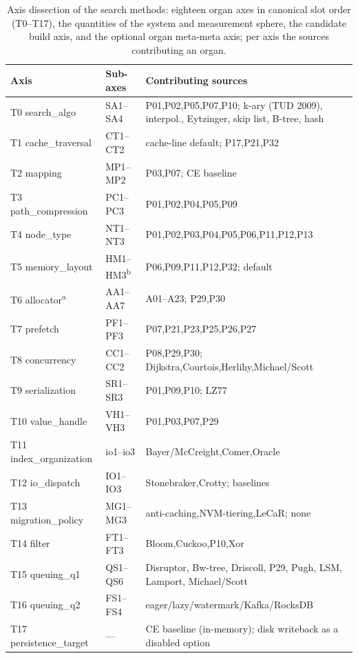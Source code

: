 \begin{nurlang}
\begin{table}[!htbp]
  \caption{Axis dissection of the search methods: eighteen organ axes in canonical
  slot order (T0--T17), the quantities of the system and measurement sphere, the
  candidate build axis, and the optional organ meta-meta axis; per axis the sources contributing an organ.}\label{tab:axes-overview}
  \centering\footnotesize
  \begin{tabular}{@{}l l p{6.8cm}@{}}
    \toprule
    \textbf{Axis} & \textbf{Sub-axes} & \textbf{Contributing sources} \\
    \midrule
    T0 search\_algo & SA1--SA4 & P01,P02,P05,P07,P10; k-ary (TUD 2009), interpol., Eytzinger, skip list, B-tree, hash \\
    T1 cache\_traversal & CT1--CT2 & cache-line default; P17,P21,P32 \\
    T2 mapping & MP1--MP2 & P03,P07; CE baseline \\
    T3 path\_compression & PC1--PC3 & P01,P02,P04,P05,P09 \\
    T4 node\_type & NT1--NT3 & P01,P02,P03,P04,P05,P06,P11,P12,P13 \\
    T5 memory\_layout & HM1--HM3\textsuperscript{b} & P06,P09,P11,P12,P32; default \\
    T6 allocator\textsuperscript{a} & AA1--AA7 & A01--A23; P29,P30 \\
    T7 prefetch & PF1--PF3 & P07,P21,P23,P25,P26,P27 \\
    T8 concurrency & CC1--CC2 & P08,P29,P30; Dijkstra,Courtois,Herlihy,Michael/Scott \\
    T9 serialization & SR1--SR3 & P01,P09,P10; LZ77 \\
    \midrule
    T10 value\_handle & VH1--VH3 & P01,P03,P07,P29 \\
    T11 index\_organization & io1--io3 & Bayer/McCreight,Comer,Oracle \\
    T12 io\_dispatch & IO1--IO3 & Stonebraker,Crotty; baselines \\
    T13 migration\_policy & MG1--MG3 & anti-caching,NVM-tiering,LeCaR\@; none \\
    T14 filter & FT1--FT3 & Bloom,Cuckoo,P10,Xor \\
    T15 queuing\_q1 & QS1--QS6 & Disruptor, Bw-tree, Driscoll, P29, Pugh, LSM, Lamport, Michael/Scott \\
    T16 queuing\_q2 & FS1--FS4 & eager/lazy/watermark/Kafka/RocksDB \\
    T17 persistence\_target & --- & CE baseline (in-memory); disk writeback as a disabled option \\

\end{tabular}
\end{table}
\end{nurlang}
